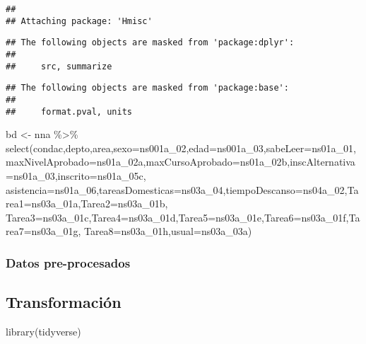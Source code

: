 \documentclass[
]{article}
\newenvironment{Shaded}{\begin{snugshade}}{\end{snugshade}}
\newcommand{\AttributeTok}[1]{\textcolor[rgb]{0.77,0.63,0.00}{#1}}
\newcommand{\FunctionTok}[1]{\textcolor[rgb]{0.00,0.00,0.00}{#1}}
\newcommand{\NormalTok}[1]{#1}
\newcommand{\OtherTok}[1]{\textcolor[rgb]{0.56,0.35,0.01}{#1}}
\newcommand{\SpecialCharTok}[1]{\textcolor[rgb]{0.00,0.00,0.00}{#1}}
\begin{document}
\begin{verbatim}
## 
## Attaching package: 'Hmisc'
\end{verbatim}

\begin{verbatim}
## The following objects are masked from 'package:dplyr':
## 
##     src, summarize
\end{verbatim}

\begin{verbatim}
## The following objects are masked from 'package:base':
## 
##     format.pval, units
\end{verbatim}

\begin{Shaded}
\begin{Highlighting}[]
\NormalTok{bd }\OtherTok{\textless{}{-}}\NormalTok{ nna }\SpecialCharTok{\%\textgreater{}\%} \FunctionTok{select}\NormalTok{(condac,depto,area,}\AttributeTok{sexo=}\NormalTok{ns001a\_02,}\AttributeTok{edad=}\NormalTok{ns001a\_03,}\AttributeTok{sabeLeer=}\NormalTok{ns01a\_01,}
\AttributeTok{maxNivelAprobado=}\NormalTok{ns01a\_02a,}\AttributeTok{maxCursoAprobado=}\NormalTok{ns01a\_02b,}\AttributeTok{inscAlternativa=}\NormalTok{ns01a\_03,}\AttributeTok{inscrito=}\NormalTok{ns01a\_05c,}
\AttributeTok{asistencia=}\NormalTok{ns01a\_06,}\AttributeTok{tareasDomesticas=}\NormalTok{ns03a\_04,}\AttributeTok{tiempoDescanso=}\NormalTok{ns04a\_02,}\AttributeTok{Tarea1=}\NormalTok{ns03a\_01a,}\AttributeTok{Tarea2=}\NormalTok{ns03a\_01b,}
\AttributeTok{Tarea3=}\NormalTok{ns03a\_01c,}\AttributeTok{Tarea4=}\NormalTok{ns03a\_01d,}\AttributeTok{Tarea5=}\NormalTok{ns03a\_01e,}\AttributeTok{Tarea6=}\NormalTok{ns03a\_01f,}\AttributeTok{Tarea7=}\NormalTok{ns03a\_01g,}
\AttributeTok{Tarea8=}\NormalTok{ns03a\_01h,}\AttributeTok{usual=}\NormalTok{ns03a\_03a)}
\end{Highlighting}
\end{Shaded}

\hypertarget{datos-pre-procesados}{%
\subsubsection{Datos pre-procesados}\label{datos-pre-procesados}}

\hypertarget{transformaciuxf3n}{%
\subsection{Transformación}\label{transformaciuxf3n}}

\begin{Shaded}
\begin{Highlighting}[]
\FunctionTok{library}\NormalTok{(tidyverse)}
\end{Highlighting}
\end{Shaded}
\end{document}
